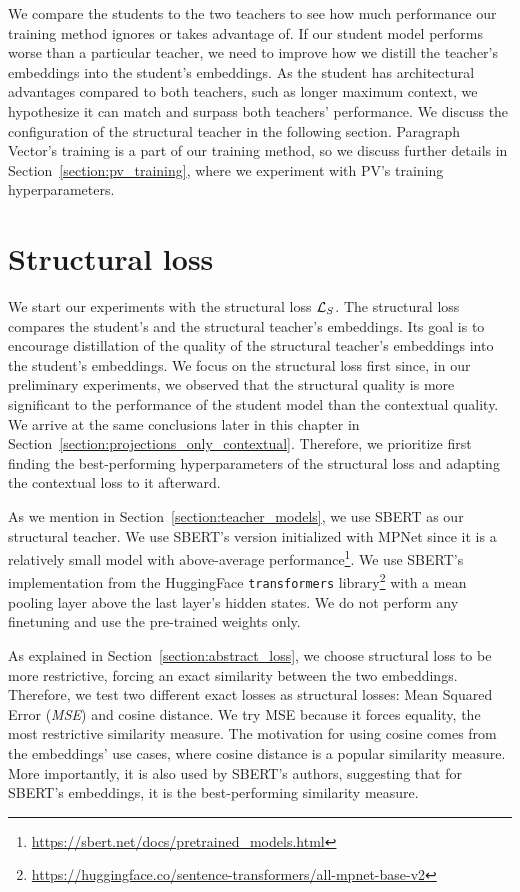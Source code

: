 We compare the students to the two teachers to see how much performance our
training method ignores or takes advantage of. If our student model performs
worse than a particular teacher, we need to improve how we distill
the teacher's embeddings into the student's embeddings. As the student has
architectural advantages compared to both teachers, such as longer maximum
context, we hypothesize it can match and surpass both teachers' performance. We discuss the configuration of the structural teacher in the
following section. Paragraph Vector's training is a part of our training
method, so we discuss further details in Section~\ref{section:pv_training},
where we experiment with PV's training hyperparameters.

\section{Structural loss}\label{section:structural_loss}

We start our experiments with the structural loss $\mathcal{L}_S$. The structural
loss compares the student's and the structural teacher's embeddings. Its
goal is to encourage distillation of the quality of the structural teacher's
embeddings into the student's embeddings. We focus on the structural loss first
since, in our preliminary experiments, we observed that the structural quality
is more significant to the performance of the student model than the contextual
quality. We arrive at the same conclusions later in this chapter in
Section~\ref{section:projections_only_contextual}. Therefore, we prioritize
first finding the best-performing hyperparameters of the structural loss and
adapting the contextual loss to it afterward.

As we mention in Section~\ref{section:teacher_models}, we use SBERT
\citep{reimers2019sentence} as our structural teacher. We use SBERT's version
initialized with MPNet \citep{song2020mpnet} since it is a relatively small
model with above-average
performance\footnote{\url{https://sbert.net/docs/pretrained_models.html}}. We
use SBERT's implementation from the HuggingFace \texttt{transformers}
library\footnote{\url{https://huggingface.co/sentence-transformers/all-mpnet-base-v2}}
with a mean pooling layer above the last layer's hidden states. We do not perform
any finetuning and use the pre-trained weights only.

As explained in Section~\ref{section:abstract_loss}, we choose structural loss
to be more restrictive, forcing an exact similarity between the two embeddings.
Therefore, we test two different exact losses as structural losses: Mean Squared
Error (\emph{MSE}) and cosine distance. We try MSE because it forces
equality, the most restrictive similarity measure. The motivation for using
cosine comes from the embeddings' use cases, where cosine distance is a popular
similarity measure. More importantly, it is also used by SBERT's authors,
suggesting that for SBERT's embeddings, it is the best-performing similarity
measure.

